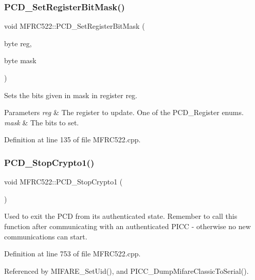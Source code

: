 \subsubsection{\texorpdfstring{P\+C\+D\+\_\+\+Set\+Register\+Bit\+Mask()}{PCD\_SetRegisterBitMask()}}
{\footnotesize\ttfamily void M\+F\+R\+C522\+::\+P\+C\+D\+\_\+\+Set\+Register\+Bit\+Mask (\begin{DoxyParamCaption}\item[{byte}]{reg,  }\item[{byte}]{mask }\end{DoxyParamCaption})}

Sets the bits given in mask in register reg. 
\begin{DoxyParams}{Parameters}
{\em reg} & The register to update. One of the P\+C\+D\+\_\+\+Register enums. \\
\hline
{\em mask} & The bits to set. \\
\hline
\end{DoxyParams}


Definition at line 135 of file M\+F\+R\+C522.\+cpp.

\mbox{\label{class_m_f_r_c522_a24d3ab7b2170fdfa3f0121a7256f12d9}} 
\subsubsection{\texorpdfstring{P\+C\+D\+\_\+\+Stop\+Crypto1()}{PCD\_StopCrypto1()}}
{\footnotesize\ttfamily void M\+F\+R\+C522\+::\+P\+C\+D\+\_\+\+Stop\+Crypto1 (\begin{DoxyParamCaption}{ }\end{DoxyParamCaption})}

Used to exit the P\+CD from its authenticated state. Remember to call this function after communicating with an authenticated P\+I\+CC -\/ otherwise no new communications can start. 

Definition at line 753 of file M\+F\+R\+C522.\+cpp.



Referenced by M\+I\+F\+A\+R\+E\+\_\+\+Set\+Uid(), and P\+I\+C\+C\+\_\+\+Dump\+Mifare\+Classic\+To\+Serial().

\mbox{\label{class_m_f_r_c522_a4d967509ca687fca2dbfd0d867b38d8d}} 
